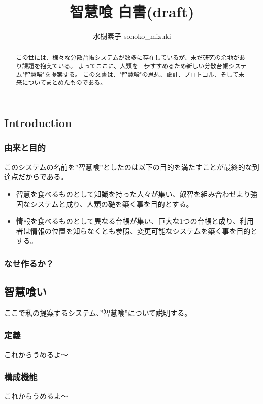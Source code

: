 \documentclass[a4j]{jarticle}
\title{智慧喰 白書(draft)}
\author{水樹素子 sonoko\_mizuki}
\begin{document}
\maketitle
\begin{abstract}
この世には、様々な分散台帳システムが数多に存在しているが、未だ研究の余地があり課題を抱えている。
よってここに、人類を一歩すすめるため新しい分散台帳システム"智慧喰"を提案する。
この文書は、"智慧喰"の思想、設計、プロトコル、そして未来についてまとめたものである。
\end{abstract}

\begin{multicols}{2}
\newpage

\subsection{Introduction}
\subsubsection{由来と目的}
このシステムの名前を”智慧喰”としたのは以下の目的を満たすことが最終的な到達点だからである。
\begin{itemize}
  \item 智慧を食べるものとして知識を持った人々が集い、叡智を組み合わせより強固なシステムと成り、人類の礎を築く事を目的とする。
  \item 情報を食べるものとして異なる台帳が集い、巨大な1つの台帳と成り、利用者は情報の位置を知らなくとも参照、変更可能なシステムを築く事を目的とする。
\end{itemize}

\subsubsection{なせ作るか？}

\subsection{智慧喰い}
ここで私の提案するシステム、”智慧喰”について説明する。
\subsubsection{定義}

これからうめるよ〜

\subsubsection{構成機能}
これからうめるよ〜


\end{multicols}
\end{document}
